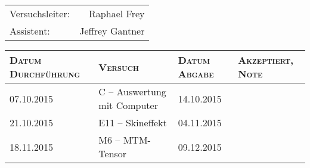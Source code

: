 \begin{titlepage}

    \maketitle

    \vspace{10mm}
    \begin{center}
    \begin{tabular}{lr}

        \Huge{Versuchsleiter:} & \Huge{Raphael Frey} \\
        \Huge{Assistent:} & \Huge{Jeffrey Gantner} \\

    \end{tabular}

    \vspace{20mm}

    \Large
    \begin{tabular}{p{27mm}|p{67mm}|p{23mm}|p{26mm}}


        \textsc{Datum Durchf\"uhrung} & \textsc{Versuch} & \textsc{Datum Abgabe} & \textsc{Akzeptiert, Note} \\
        [10mm]
        \hline
        07.10.2015 & C -- Auswertung mit Computer & 14.10.2015 & \\
        [10mm]
        21.10.2015 & E11 -- Skineffekt            & 04.11.2015 & \\
        [10mm]
        18.11.2015 & M6 -- MTM-Tensor             & 09.12.2015 & \\

    \end{tabular}
    \end{center}
    \normalsize

\end{titlepage}
